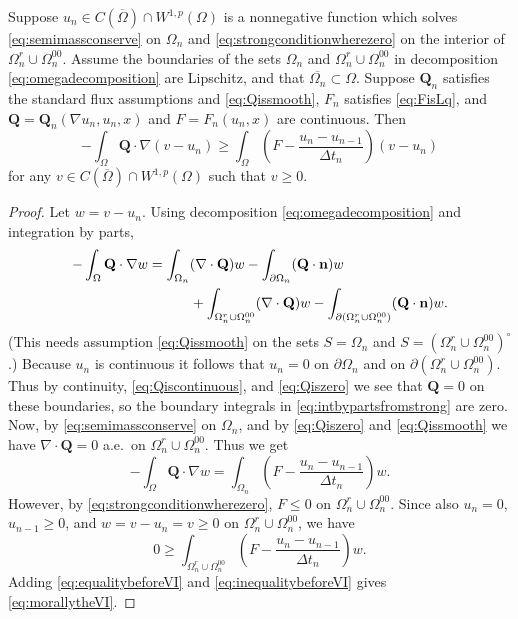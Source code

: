 \documentclass[final,onefignum]{siamart190516}
\newcommand\bn{\mathbf{n}}
\newcommand\bQ{\mathbf{Q}}
\newcommand{\Div}{\nabla\cdot}
\newcommand{\grad}{\nabla}
\begin{document}
\begin{theorem} \label{thm:strongimpliesweak}  Suppose $u_n \in C(\overline{\Omega}) \cap W^{1,p}(\Omega)$ is a nonnegative function which solves \eqref{eq:semimassconserve} on $\Omega_n$ and \eqref{eq:strongconditionwherezero} on the interior of $\Omega_n^r \cup \Omega_n^{00}$.  Assume the boundaries of the sets $\Omega_n$ and $\Omega_n^r \cup \Omega_n^{00}$ in decomposition \eqref{eq:omegadecomposition} are Lipschitz, and that $\overline{\Omega_n} \subset \Omega$.  Suppose $\bQ_n$ satisfies the standard flux assumptions and \eqref{eq:Qissmooth}, $F_n$ satisfies \eqref{eq:FisLq}, and $\bQ = \bQ_n(\grad u_n,u_n,x)$ and $F=F_n(u_n,x)$ are continuous.  Then
\begin{equation}
-\int_{\Omega} \bQ \cdot \grad(v-u_n) \ge \int_{\Omega} \left(F - \frac{u_n - u_{n-1}}{\Delta t_n}\right) (v-u_n) \label{eq:morallytheVI}
\end{equation}
for any $v \in C(\overline{\Omega}) \cap W^{1,p}(\Omega)$ such that $v \ge 0$.
\end{theorem}

\begin{proof}  Let $w=v-u_n$.  Using decomposition \eqref{eq:omegadecomposition} and integration by parts,
\begin{align}
-\int_{\Omega} \bQ \cdot \grad w &= \int_{\Omega_n} (\Div \bQ) w - \int_{\partial \Omega_n} (\bQ \cdot \bn) w \label{eq:intbypartsfromstrong} \\
  &\qquad\quad + \int_{\Omega_n^r \cup \Omega_n^{00}} (\Div \bQ) w - \int_{\partial(\Omega_n^r \cup \Omega_n^{00})} (\bQ \cdot \bn) w. \notag
\end{align}
(This needs assumption \eqref{eq:Qissmooth} on the sets $S=\Omega_n$ and $S=(\Omega_n^r \cup \Omega_n^{00})^\circ$.)  Because $u_n$ is continuous it follows that $u_n=0$ on $\partial \Omega_n$ and on $\partial(\Omega_n^r \cup \Omega_n^{00})$.  Thus by continuity, \eqref{eq:Qiscontinuous}, and \eqref{eq:Qiszero} we see that $\bQ=0$ on these boundaries, so the boundary integrals in \eqref{eq:intbypartsfromstrong} are zero.  Now, by \eqref{eq:semimassconserve} on $\Omega_n$, and by \eqref{eq:Qiszero} and \eqref{eq:Qissmooth} we have $\Div \bQ=0$ a.e.~on $\Omega_n^r \cup \Omega_n^{00}$.  Thus we get
\begin{equation}
-\int_{\Omega} \bQ \cdot \grad w = \int_{\Omega_n} \left(F - \frac{u_n - u_{n-1}}{\Delta t_n}\right) w. \label{eq:equalitybeforeVI}
\end{equation}
However, by \eqref{eq:strongconditionwherezero}, $F \le 0$ on $\Omega_n^r \cup \Omega_n^{00}$.  Since also $u_n=0$, $u_{n-1}\ge 0$, and $w = v-u_n = v \ge 0$ on $\Omega_n^r \cup \Omega_n^{00}$, we have
\begin{equation}
    0 \ge \int_{\Omega_n^r \cup \Omega_n^{00}} \left(F - \frac{u_n - u_{n-1}}{\Delta t_n}\right) w. \label{eq:inequalitybeforeVI}
\end{equation}
Adding \eqref{eq:equalitybeforeVI} and \eqref{eq:inequalitybeforeVI} gives \eqref{eq:morallytheVI}.
\end{proof}
\end{document}

